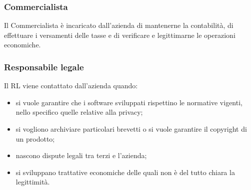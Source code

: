 \subsubsection{Commercialista}
Il Commercialista \`{e} incaricato dall\textquoteright{}azienda di mantenerne la contabilit\`{a}, di effettuare i
versamenti delle tasse e di verificare e legittimarne le operazioni economiche.

\subsubsection{Responsabile legale}
Il RL viene contattato dall\textquoteright{}azienda quando:
\begin{itemize}
\item si vuole garantire che i software sviluppati rispettino le normative vigenti, nello
specifico quelle relative alla privacy;
\item si vogliono archiviare particolari brevetti o si vuole garantire il copyright di un
prodotto;
\item nascono dispute legali tra terzi e l\textquoteright{}azienda;
\item si sviluppano trattative economiche delle quali non \`{e} del tutto chiara la legittimit\`{a}.
\end{itemize}